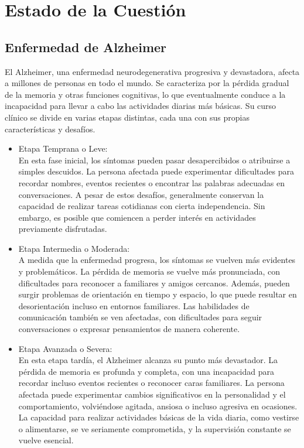 \chapter{Estado de la Cuestión}
\label{cap:estadoDeLaCuestion}


\section{Enfermedad de Alzheimer}
El Alzheimer, una enfermedad neurodegenerativa progresiva y devastadora, afecta a millones de personas en todo el mundo. Se caracteriza por la pérdida gradual de la memoria y otras funciones cognitivas, lo que eventualmente conduce a la incapacidad para llevar a cabo las actividades diarias más básicas. Su curso clínico se divide en varias etapas distintas, cada una con sus propias características y desafíos.
\begin{itemize}
\item Etapa Temprana o Leve:\\
En esta fase inicial, los síntomas pueden pasar desapercibidos o atribuirse a simples descuidos. La persona afectada puede experimentar dificultades para recordar nombres, eventos recientes o encontrar las palabras adecuadas en conversaciones. A pesar de estos desafíos, generalmente conservan la capacidad de realizar tareas cotidianas con cierta independencia. Sin embargo, es posible que comiencen a perder interés en actividades previamente disfrutadas.

\item Etapa Intermedia o Moderada:\\
A medida que la enfermedad progresa, los síntomas se vuelven más evidentes y problemáticos. La pérdida de memoria se vuelve más pronunciada, con dificultades para reconocer a familiares y amigos cercanos. Además, pueden surgir problemas de orientación en tiempo y espacio, lo que puede resultar en desorientación incluso en entornos familiares. Las habilidades de comunicación también se ven afectadas, con dificultades para seguir conversaciones o expresar pensamientos de manera coherente.

\item Etapa Avanzada o Severa:\\
En esta etapa tardía, el Alzheimer alcanza su punto más devastador. La pérdida de memoria es profunda y completa, con una incapacidad para recordar incluso eventos recientes o reconocer caras familiares. La persona afectada puede experimentar cambios significativos en la personalidad y el comportamiento, volviéndose agitada, ansiosa o incluso agresiva en ocasiones. La capacidad para realizar actividades básicas de la vida diaria, como vestirse o alimentarse, se ve seriamente comprometida, y la supervisión constante se vuelve esencial.
\end{itemize}
